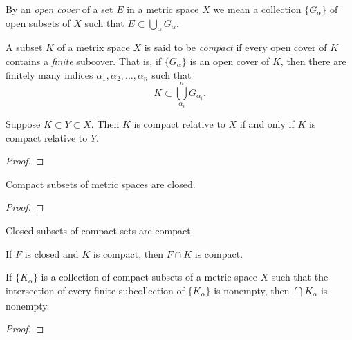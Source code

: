 \documentclass[11pt,a4paper]{book}
\begin{document}
\begin{definition}
    By an \textit{open cover} of a set \( E  \) in a metric space \( X  \) we mean a collection \( \{ {G}_{\alpha} \}  \) of open subsets of \( X  \) such that \( E \subset \bigcup_{ \alpha  }^{  } {G}_{\alpha} \).
\end{definition}   

\begin{definition}
    A subset \( K  \) of a metrix space \( X  \) is said to be \textit{compact} if every open cover of \( K  \) contains a \textit{finite} subcover. That is, if \( \{ {G}_{\alpha} \}  \) is an open cover of \( K  \), then there are finitely many indices \( {\alpha}_{1}, {\alpha}_{2}, \dots , {\alpha}_{n} \) such that
    \[  K \subset \bigcup_{ \alpha_i }^{n  } {G}_{{\alpha}_{i}}. \]
\end{definition}



\begin{theorem}[ ]
    Suppose \( K \subset Y \subset X  \). Then \( K  \) is compact relative to \( X  \) if and only if \( K  \) is compact relative to \( Y  \).
\end{theorem}
\begin{proof}

\end{proof}

\begin{theorem}[ ]
    Compact subsets of metric spaces are closed.
\end{theorem}

\begin{proof}

\end{proof}

\begin{theorem}[ ]
    Closed subsets of compact sets are compact.
\end{theorem}

\begin{corollary}
    If \( F  \) is closed and \( K  \) is compact, then \( F \cap K  \) is compact.
\end{corollary}

\begin{theorem}[ ]
    If \( \{ {K}_{\alpha} \}  \) is a collection of compact subsets of a metric space \( X  \) such that the intersection of every finite subcollection of \( \{ {K}_{\alpha} \}  \) is nonempty, then \( \bigcap_{  }^{  }  {K}_{\alpha} \) is nonempty.
\end{theorem}
\begin{proof}

\end{proof}
\end{document}
